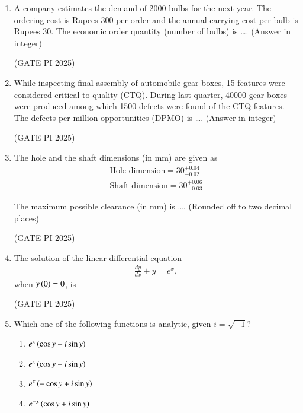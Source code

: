 \documentclass[journal,12pt,onecolumn]{IEEEtran}
\theoremstyle{remark}
\begin{document}
\begin{enumerate}
\item A company estimates the demand of 2000 bulbs for the next year. The ordering cost is Rupees 300 per order and the annual carrying cost per bulb is Rupees 30. The economic order quantity (number of bulbs) is \dots. (Answer in integer)

\hfill (GATE PI 2025)

\item While inspecting final assembly of automobile-gear-boxes, 15 features were considered critical-to-quality (CTQ). During last quarter, 40000 gear boxes were produced among which 1500 defects were found of the CTQ features. The defects per million opportunities (DPMO) is \dots. (Answer in integer)

\hfill (GATE PI 2025)

\item The hole and the shaft dimensions (in mm) are given as
\begin{align*}
\text{Hole dimension}=30^{+0.04}_{-0.02} \\
\text{Shaft dimension}=30^{+0.06}_{-0.03}
\end{align*}

The maximum possible clearance (in mm) is \dots. (Rounded off to two decimal places)

\hfill (GATE PI 2025)

\item The solution of the linear differential equation
\begin{align*}
\frac{dy}{dx}+y=e^{x},
\end{align*}
when $y\left(0\right)=0$, is

\begin{enumerate}
\end{enumerate}

\hfill (GATE PI 2025)

\item Which one of the following functions is analytic, given $i=\sqrt{-1}$?

\begin{enumerate}
\item $e^{x} \left(\cos y+i\sin y \right)$
\item $e^{x} \left(\cos y-i\sin y \right)$
\item $e^{x} \left(-\cos y+i\sin y\right)$
\item $e^{-x} \left(\cos y+i\sin y \right)$
\end{enumerate}


\end{enumerate}
\end{document}
